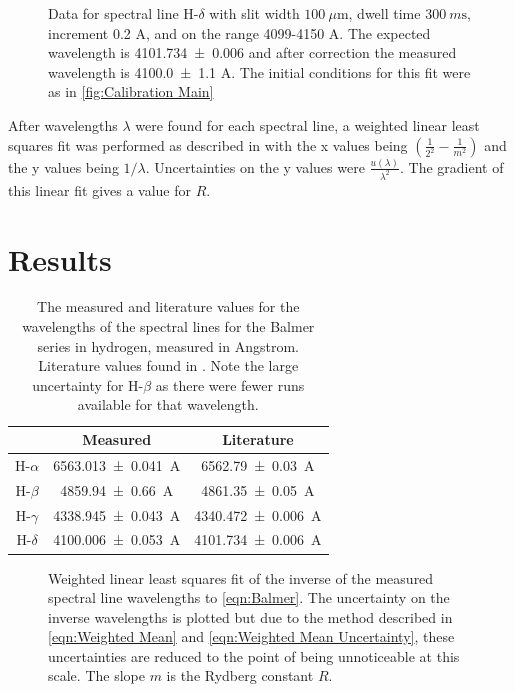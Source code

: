\documentclass[11pt]{article}
\numberwithin{equation}{section}
\numberwithin{figure}{section}
\numberwithin{table}{section}
\begin{document}
\begin{figure}[H]
    \begin{center}
       \caption{Data for spectral line H-$\delta$ with slit width $\SI{100}{\mu\m}$, dwell time $\SI{300}{m\second}$, increment 0.2 A, and on the range 4099-4150 A. The expected wavelength is \num{4101.734\pm0.006}\cite{Spectral Lines} and after correction the measured wavelength is \num{4100.0\pm1.1} A. The initial conditions for this fit were as in \autoref{fig:Calibration Main}}
       \label{fig:DataMain}
    \end{center}
\end{figure}

\par After wavelengths $\lambda$ were found for each spectral line, a weighted linear least squares fit was performed as described in \cite{Kirkup} with the x values being $\left(\frac{1}{2^2}-\frac{1}{m^2}\right)$ and the y values being $1/\lambda$. Uncertainties on the y values were $\frac{u(\lambda)}{\lambda^2}$. The gradient of this linear fit gives a value for $R$.

\section{Results}\label{sec:Results}
\begin{table}[H]
    \centering
    \begin{tabular}{c|c|c}
         & Measured & Literature \\\hline
        H-$\alpha$ & \SI{6563.013\pm0.041}{A} & \SI{6562.79\pm0.03}{A} \\\hline
        H-$\beta$ & \SI{4859.94\pm0.66}{A} & \SI{4861.35\pm0.05}{A}\\\hline
        H-$\gamma$ & \SI{4338.945\pm0.043}{A} & \SI{4340.472\pm0.006}{A}\\\hline
        H-$\delta$ & \SI{4100.006\pm0.053}{A} & \SI{4101.734\pm0.006 }{A}
    \end{tabular}
    \caption{The measured and literature values for the wavelengths of the spectral lines for the Balmer series in hydrogen, measured in Angstrom. Literature values found in \cite{Spectral Lines}. Note the large uncertainty for H-$\beta$ as there were fewer runs available for that wavelength.}
    \label{tbl:Spectral Lines}
\end{table}

\begin{figure}[H]
    \begin{center}
       \caption{Weighted linear least squares fit of the inverse of the measured spectral line wavelengths to \autoref{eqn:Balmer}. The uncertainty on the inverse wavelengths is plotted but due to the method described in \autoref{eqn:Weighted Mean} and \autoref{eqn:Weighted Mean Uncertainty}, these uncertainties are reduced to the point of being unnoticeable at this scale. The slope $m$ is the Rydberg constant $R$.}
       \label{fig:Fit}
    \end{center}
\end{figure}
\end{document}
